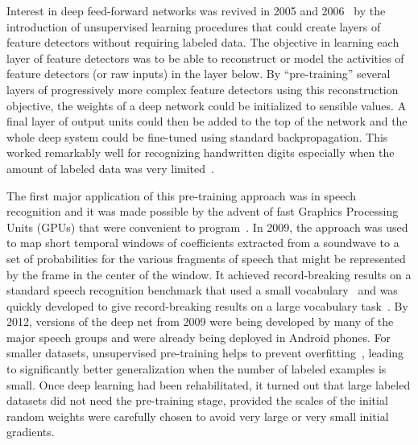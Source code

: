 \documentclass[]{article}
\begin{document}
Interest in deep feed-forward networks was revived in
2005 and 2006~\citep{IJCAI,Hinton06-small,Bengio-nips-2006-small,ranzato-07-small} 
by the introduction
of unsupervised learning procedures that could create layers of feature
detectors without requiring labeled data. The objective in learning each
layer of feature detectors was to be able to reconstruct or model the
activities of feature detectors (or raw inputs) in the layer below.  By
``pre-training'' several layers of progressively more complex feature
detectors using this reconstruction objective, the weights of a deep
network could be initialized to sensible values.  A final layer of output
units could then be added to the top of the network and the whole deep
system could be fine-tuned using standard
backpropagation\citep{Hinton-Science2006}. This worked remarkably well for recognizing
handwritten digits especially when the amount of labeled data was very
limited~\citep{Bengio-nips-2006-small,Erhan+al-2010-small}.

The first major application of this pre-training approach was in speech
recognition and it was made possible by the advent of fast Graphics
Processing Units (GPUs) that were convenient to program~\citep{RainaICML09-small}.  
In 2009, the approach was used to map short temporal windows of coefficients extracted
from a soundwave to a set of probabilities for the various fragments of
speech that might be represented by the frame in the center of the window.
It achieved record-breaking results on a standard speech recognition
benchmark that used a small vocabulary~\citep{TIMITpaper} and was quickly
developed to give record-breaking results on a large vocabulary
task~\citep{Dahl}.  By 2012, versions of the deep net from 2009 were being
developed by many of the major speech groups\citep{Hinton-et-al-2012} and were already
being deployed in Android phones.  For smaller datasets, unsupervised
pre-training helps to prevent overfitting~\citep{Erhan+al-2010-small}, 
leading to significantly better generalization when the number of
labeled examples is small. Once deep
learning had been rehabilitated, it turned out that large labeled datasets
did not need the pre-training stage, provided the scales of the initial
random weights were carefully chosen to avoid very large or very small
initial gradients.
\end{document}
